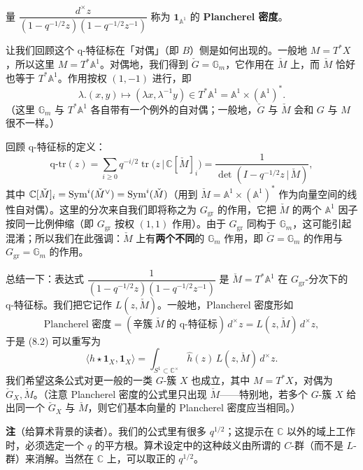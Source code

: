 \begin{defn}
  量 $\dfrac{d^\times z}{(1-q^{-1/2}z)(1-q^{-1/2}z^{-1})}$ 称为 $\mathbf 1_{\mathbb A^1}$ 的 \textbf{Plancherel 密度}。
\end{defn}

让我们回顾这个 q-特征标在「对偶」（即 $B$）侧是如何出现的。一般地 $M=T^*X$，所以这里 $M=T^*\mathbb A^1$。对偶地，我们得到 $\check G=\mathbb G_m$，它作用在 $\check M$ 上，而 $\check M$ 恰好也等于 $T^*\mathbb A^1$。作用按权 $(1,-1)$ 进行，即
\[
  \lambda.(x,y)\mapsto(\lambda x,\lambda^{-1}y)\in T^*\mathbb A^1=\mathbb A^1\times(\mathbb A^1)^*.
\]
（这里 $\mathbb G_m$ 与 $T^*\mathbb A^1$ 各自带有一个例外的自对偶；一般地，$\check G$ 与 $\check M$ 会和 $G$ 与 $M$ 很不一样。）

回顾 q-特征标的定义：
\begin{equation}
  \mathrm{q\text{-}tr}(z)=\sum_{i\ge0}q^{-i/2}\operatorname{tr}\big(z\,|\,\mathbb C[\check M]_i\big)
  =\frac{1}{\det(I-q^{-1/2}z\,|\,\check M)},
  \label{eq:8-4}
\end{equation}
其中 $\mathbb C[\check M]_i=\operatorname{Sym}^i(\check M^\vee)=\operatorname{Sym}^i(\check M)$（用到 $\check M=\mathbb A^1\times(\mathbb A^1)^*$ 作为向量空间的线性自对偶）。这里的分次来自我们即将称之为 $G_{\mathrm{gr}}$ 的作用，它把 $\check M$ 的两个 $\mathbb A^1$ 因子按同一比例伸缩（即 $G_{\mathrm{gr}}$ 按权 $(1,1)$ 作用）。由于 $G_{\mathrm{gr}}$ 同构于 $\mathbb G_m$，这可能引起混淆；所以我们在此强调：$\check M$ 上有\textbf{两个不同}的 $\mathbb G_m$ 作用，即 $\check G=\mathbb G_m$ 的作用与 $G_{\mathrm{gr}}=\mathbb G_m$ 的作用。

总结一下：表达式 $\dfrac{1}{(1-q^{-1/2}z)(1-q^{-1/2}z^{-1})}$ 是 $\check M=T^*\mathbb A^1$ 在 $G_{\mathrm{gr}}$-分次下的 q-特征标。我们把它记作 $L(z,\check M)$。一般地，Plancherel 密度形如
\[
  \text{Plancherel 密度}=(\text{辛簇}\ \check M\ \text{的 q-特征标})\,d^\times z=L(z,\check M)\,d^\times z,
\]
于是 (8.2) 可以重写为
\begin{equation}
  \langle h\star\mathbf 1_X,\mathbf 1_X\rangle=\int_{S^1\subset\mathbb C^\times}\hat h(z)\,L(z,\check M)\,d^\times z.
  \label{eq:8-5}
\end{equation}
我们希望这条公式对更一般的一类 $G$-簇 $X$ 也成立，其中 $M=T^*X$，对偶为 $\check G_X,\check M$。（注意 Plancherel 密度的公式里只出现 $\check M$——特别地，若多个 $G$-簇 $X$ 给出同一个 $\check G_X$ 与 $\check M$，则它们基本向量的 Plancherel 密度应当相同。）

\textbf{注}（给算术背景的读者）。我们的公式里有很多 $q^{1/2}$；这提示在 $\mathbb C$ 以外的域上工作时，必须选定一个 $q$ 的平方根。算术设定中的这种歧义由所谓的 $C$-群（而不是 $L$-群）来消解。当然在 $\mathbb C$ 上，可以取正的 $q^{1/2}$。

